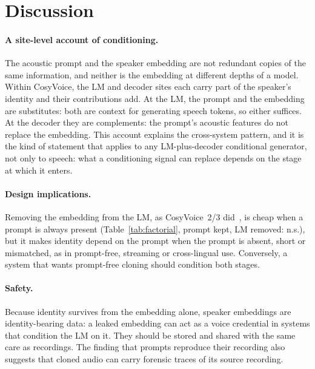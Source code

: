 \documentclass[10pt]{article}
\begin{document}
\section{Discussion}
\label{sec:discussion}

\paragraph{A site-level account of conditioning.}
The acoustic prompt and the speaker embedding are not redundant copies of the same information, and neither is the embedding at different depths of a model.
Within CosyVoice, the LM and decoder sites each carry part of the speaker's identity and their contributions add.
At the LM, the prompt and the embedding are substitutes: both are context for generating speech tokens, so either suffices.
At the decoder they are complements: the prompt's acoustic features do not replace the embedding.
This account explains the cross-system pattern, and it is the kind of statement that applies to any LM-plus-decoder conditional generator, not only to speech: what a conditioning signal can replace depends on the stage at which it enters.

\paragraph{Design implications.}
Removing the embedding from the LM, as CosyVoice~2/3 did~\citep{cosyvoice2,chen2026bottleneck}, is cheap when a prompt is always present (Table~\ref{tab:factorial}, prompt kept, LM removed: n.s.), but it makes identity depend on the prompt when the prompt is absent, short or mismatched, as in prompt-free, streaming or cross-lingual use.
Conversely, a system that wants prompt-free cloning should condition both stages.

\paragraph{Safety.}
Because identity survives from the embedding alone, speaker embeddings are identity-bearing data: a leaked embedding can act as a voice credential in systems that condition the LM on it.
They should be stored and shared with the same care as recordings.
The finding that prompts reproduce their recording also suggests that cloned audio can carry forensic traces of its source recording.
\end{document}
